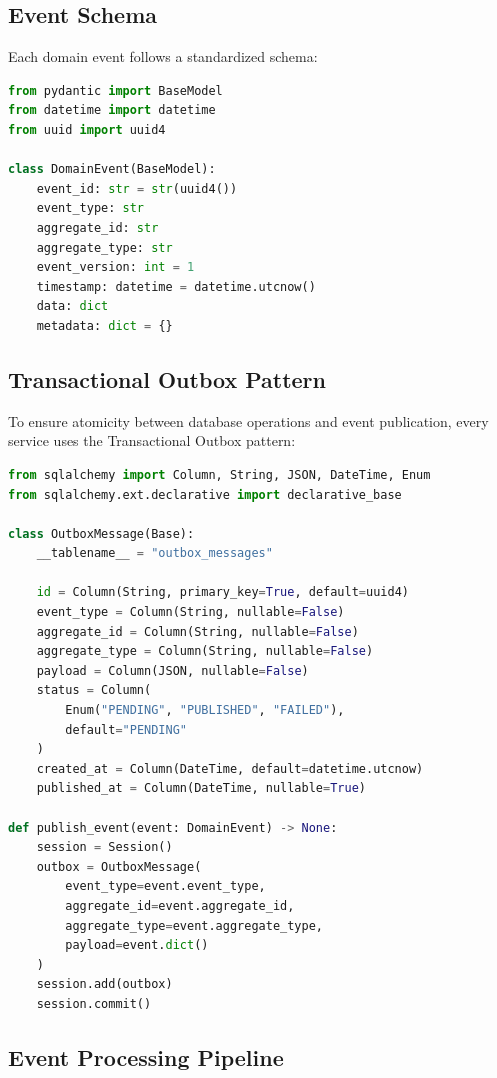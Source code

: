 \subsection{Event Schema}

Each domain event follows a standardized schema:

\begin{lstlisting}[language=Python, caption=Domain Event Base Class]
from pydantic import BaseModel
from datetime import datetime
from uuid import uuid4

class DomainEvent(BaseModel):
    event_id: str = str(uuid4())
    event_type: str
    aggregate_id: str
    aggregate_type: str
    event_version: int = 1
    timestamp: datetime = datetime.utcnow()
    data: dict
    metadata: dict = {}
\end{lstlisting}

\subsection{Transactional Outbox Pattern}

To ensure atomicity between database operations and event publication, every service uses the Transactional Outbox pattern:

\begin{lstlisting}[language=Python, caption=Transactional Outbox Implementation]
from sqlalchemy import Column, String, JSON, DateTime, Enum
from sqlalchemy.ext.declarative import declarative_base

class OutboxMessage(Base):
    __tablename__ = "outbox_messages"

    id = Column(String, primary_key=True, default=uuid4)
    event_type = Column(String, nullable=False)
    aggregate_id = Column(String, nullable=False)
    aggregate_type = Column(String, nullable=False)
    payload = Column(JSON, nullable=False)
    status = Column(
        Enum("PENDING", "PUBLISHED", "FAILED"),
        default="PENDING"
    )
    created_at = Column(DateTime, default=datetime.utcnow)
    published_at = Column(DateTime, nullable=True)

def publish_event(event: DomainEvent) -> None:
    session = Session()
    outbox = OutboxMessage(
        event_type=event.event_type,
        aggregate_id=event.aggregate_id,
        aggregate_type=event.aggregate_type,
        payload=event.dict()
    )
    session.add(outbox)
    session.commit()
\end{lstlisting}

\subsection{Event Processing Pipeline}

